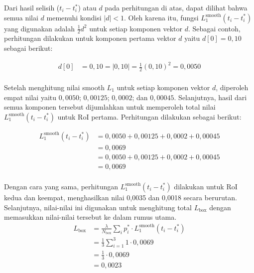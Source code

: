 Dari hasil selisih ($t_i - t_i^*$) atau $d$ pada perhitungan di atas, dapat dilihat bahwa semua nilai $d$ memenuhi kondisi $|d| < 1$. Oleh karena itu, fungsi $L_1^{\text{smooth}}(t_i - t_i^*)$ yang digunakan adalah $\frac{1}{2}d^2$ untuk setiap komponen vektor $d$. Sebagai contoh, perhitungan dilakukan untuk komponen pertama vektor $d$ yaitu $d[0] = 0{,}10$ sebagai berikut:


\begin{align*}
    d[0] &= 0{,}10 = |0{,}10| = \frac{1}{2}(0{,}10)^2 = 0{,}0050 \\
\end{align*}

Setelah menghitung nilai smooth $L_1$ untuk setiap komponen vektor $d$, diperoleh empat nilai yaitu $0{,}0050$; $0{,}00125$; $0{,}0002$; dan $0{,}00045$. Selanjutnya, hasil dari semua komponen tersebut dijumlahkan untuk memperoleh total nilai $L_1^{\text{smooth}}(t_i - t_i^*)$ untuk RoI pertama. Perhitungan dilakukan sebagai berikut:

\begin{align*}
    L_1^{\text{smooth}}(t_i - t_i^*) &= 0{,}0050 + 0{,}00125 + 0{,}0002 + 0{,}00045 \\[0.5em]
     &= 0{,}0069 \\[0.5em]
     &= 0{,}0050 + 0{,}00125 + 0{,}0002 + 0{,}00045 \\[0.5em]
     &= 0{,}0069 \\[0.5em]
\end{align*}

Dengan cara yang sama, perhitungan $L_1^{\text{smooth}}(t_i - t_i^*)$ dilakukan untuk RoI kedua dan keempat, menghasilkan nilai 0{,}0035 dan 0{,}0018 secara berurutan. Selanjutnya, nilai-nilai ini digunakan untuk menghitung total $L_{\text{box}}$ dengan memasukkan nilai-nilai tersebut ke dalam rumus utama. \\
\begin{align*}
    L_{\text{box}} &= \frac{\lambda}{N_{\text{box}}} \sum_i p_i^* \cdot L_1^{\text{smooth}}(t_i - t_i^*) \\[0.5em]
     &= \frac{1}{3} \sum_{i=1}^{3} 1 \cdot 0{,}0069 \\[0.5em]
     &= \frac{1}{3} \cdot 0{,}0069 \\[0.5em]
     &= 0{,}0023 \\[0.5em]
\end{align*}

